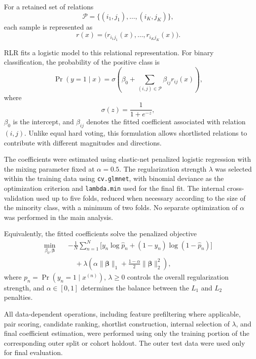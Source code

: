 \documentclass[journal]{IEEEtran}
\begin{document}
For a retained set of relations
\[
\mathcal{P}=\{(i_1,j_1),\dots,(i_K,j_K)\},
\]
each sample is represented as
\[
r(x)=
\big(
r_{i_1j_1}(x),\dots,r_{i_Kj_K}(x)
\big).
\]

RLR fits a logistic model to this relational representation. For binary classification, the probability of the positive class is
\[
\Pr(y=1\mid x)
=
\sigma\!\left(
\beta_0+
\sum_{(i,j)\in\mathcal{P}}
\beta_{ij}r_{ij}(x)
\right),
\]
where
\[
\sigma(z)=\frac{1}{1+e^{-z}},
\]
$\beta_0$ is the intercept, and $\beta_{ij}$ denotes the fitted coefficient associated with relation $(i,j)$. Unlike equal hard voting, this formulation allows shortlisted relations to contribute with different magnitudes and directions.

The coefficients were estimated using elastic-net penalized logistic regression with the mixing parameter fixed at $\alpha=0.5$. The regularization strength $\lambda$ was selected within the training data using \texttt{cv.glmnet}, with binomial deviance as the optimization criterion and \texttt{lambda.min} used for the final fit. The internal cross-validation used up to five folds, reduced when necessary according to the size of the minority class, with a minimum of two folds. No separate optimization of $\alpha$ was performed in the main analysis.

Equivalently, the fitted coefficients solve the penalized objective
\begin{equation}
\label{eq:rlr_objective}
\begin{aligned}
\min_{\beta_0,\boldsymbol{\beta}} \quad
& -\frac{1}{N}\sum_{n=1}^{N}
\Big[
y_n \log \hat{p}_n
+(1-y_n)\log(1-\hat{p}_n)
\Big] \\
& \quad + \lambda
\left(
\alpha \lVert \boldsymbol{\beta} \rVert_1
+\frac{1-\alpha}{2}\lVert \boldsymbol{\beta} \rVert_2^2
\right),
\end{aligned}
\end{equation}
where $\hat{p}_n=\Pr(y_n=1\mid x^{(n)})$, $\lambda\ge0$ controls the overall regularization strength, and $\alpha\in[0,1]$ determines the balance between the $L_1$ and $L_2$ penalties.

All data-dependent operations, including feature prefiltering where applicable, pair scoring, candidate ranking, shortlist construction, internal selection of $\lambda$, and final coefficient estimation, were performed using only the training portion of the corresponding outer split or cohort holdout. The outer test data were used only for final evaluation.
\end{document}
